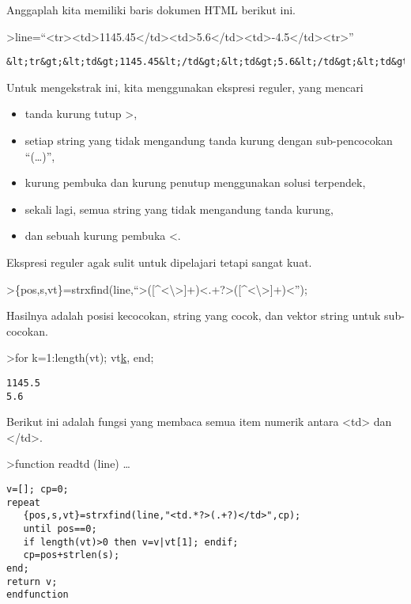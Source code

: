 \documentclass[
]{book}
\providecommand{\tightlist}{%
  \setlength{\itemsep}{0pt}\setlength{\parskip}{0pt}}
\begin{document}
Anggaplah kita memiliki baris dokumen HTML berikut ini.

\textgreater line=``\textless tr\textgreater\textless td\textgreater1145.45\textless/td\textgreater\textless td\textgreater5.6\textless/td\textgreater\textless td\textgreater-4.5\textless/td\textgreater\textless tr\textgreater{}''

\begin{verbatim}
&lt;tr&gt;&lt;td&gt;1145.45&lt;/td&gt;&lt;td&gt;5.6&lt;/td&gt;&lt;td&gt;-4.5&lt;/td&gt;&lt;tr&gt;
\end{verbatim}

Untuk mengekstrak ini, kita menggunakan ekspresi reguler, yang mencari

\begin{itemize}
\tightlist
\item
  tanda kurung tutup \textgreater,\\
\item
  setiap string yang tidak mengandung tanda kurung dengan sub-pencocokan ``(\ldots)'',
\item
  kurung pembuka dan kurung penutup menggunakan solusi terpendek,
\item
  sekali lagi, semua string yang tidak mengandung tanda kurung,
\item
  dan sebuah kurung pembuka \textless.
\end{itemize}

Ekspresi reguler agak sulit untuk dipelajari tetapi sangat kuat.

\textgreater\{pos,s,vt\}=strxfind(line,``\textgreater({[}\^{}\textless\textbackslash\textgreater{]}+)\textless.+?\textgreater({[}\^{}\textless\textbackslash\textgreater{]}+)\textless{}'');

Hasilnya adalah posisi kecocokan, string yang cocok, dan vektor string untuk sub-cocokan.

\textgreater for k=1:length(vt); vt\href{}{k}, end;

\begin{verbatim}
1145.5
5.6
\end{verbatim}

Berikut ini adalah fungsi yang membaca semua item numerik antara \textless td\textgreater{} dan \textless/td\textgreater.

\textgreater function readtd (line) \ldots{}

\begin{verbatim}
v=[]; cp=0;
repeat
   {pos,s,vt}=strxfind(line,"<td.*?>(.+?)</td>",cp);
   until pos==0;
   if length(vt)>0 then v=v|vt[1]; endif;
   cp=pos+strlen(s);
end;
return v;
endfunction
\end{verbatim}
\end{document}
